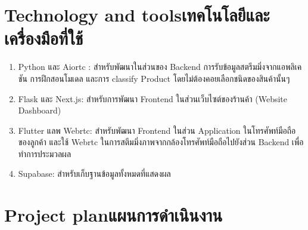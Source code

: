 \section{\ifenglish Technology and tools\else เทคโนโลยีและเครื่องมือที่ใช้\fi}
\begin{enumerate}
    \item Python และ Aiortc : สำหรับพัฒนาในส่วนของ Backend การรับข้อมูลสตรีมมิ่งจากแอพลิเคชัน การฝึกสอนโมเดล และการ classify Product
    โดยไม่ต้องคอยเลือกชนิดของสินค้านั้นๆ
    \item Flask และ Next.js: สําหรับการพัฒนา Frontend ในส่วนเว็บไซต์ของร้านค้า (Website Dashboard)
    \item Flutter แลพ Webrtc: สำหรับพัฒนา Frontend  ในส่วน Application ในโทรศัพท์มือถือของลูกค้า และใช้ Webrtc ในการสตีมมิ่งภาพจากกล้องโทรศัพท์มือถือไปยังส่วน Backend เพื่อทำการประมวลผล
    \item Supabase: สําหรับเก็บฐานข้อมูลทั้งหมดที่แสดงผล

\end{enumerate}



\section{\ifenglish Project plan\else แผนการดำเนินงาน\fi}
    
